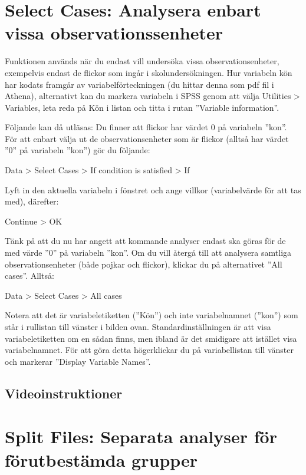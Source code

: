 \documentclass[
]{book}
\begin{document}
\hypertarget{select-cases-analysera-enbart-vissa-observationssenheter}{%
\section{Select Cases: Analysera enbart vissa observationssenheter}\label{select-cases-analysera-enbart-vissa-observationssenheter}}

Funktionen används när du endast vill undersöka vissa observationsenheter, exempelvis endast de flickor som ingår i skolundersökningen. Hur variabeln kön har kodats framgår av variabelförteckningen (du hittar denna som pdf fil i Athena), alternativt kan du markera variabeln i SPSS genom att välja Utilities \textgreater{} Variables, leta reda på Kön i listan och titta i rutan ''Variable information''.

Följande kan då utläsas: Du finner att flickor har värdet 0 på variabeln ''kon''. För att enbart välja ut de observationsenheter som är flickor (alltså har värdet ''0'' på variabeln ''kon'') gör du följande:

Data \textgreater{} Select Cases \textgreater{} If condition is satisfied \textgreater{} If

Lyft in den aktuella variabeln i fönstret och ange villkor (variabelvärde för att tas med), därefter:

Continue \textgreater{} OK

Tänk på att du nu har angett att kommande analyser endast ska göras för de med värde ''0'' på variabeln ''kon''. Om du vill återgå till att analysera samtliga observationsenheter (både pojkar och flickor), klickar du på alternativet ''All cases''. Alltså:

Data \textgreater{} Select Cases \textgreater{} All cases

Notera att det är variabeletiketten (''Kön'') och inte variabelnamnet (''kon'') som står i rullistan till vänster i bilden ovan. Standardinställningen är att visa variabeletiketten om en sådan finns, men ibland är det smidigare att istället visa variabelnamnet. För att göra detta högerklickar du på variabellistan till vänster och markerar ''Display Variable Names''.

\hypertarget{videoinstruktioner}{%
\subsection{Videoinstruktioner}\label{videoinstruktioner}}

\hypertarget{split-files-separata-analyser-fuxf6r-fuxf6rutbestuxe4mda-grupper}{%
\section{Split Files: Separata analyser för förutbestämda grupper}\label{split-files-separata-analyser-fuxf6r-fuxf6rutbestuxe4mda-grupper}}
\end{document}
